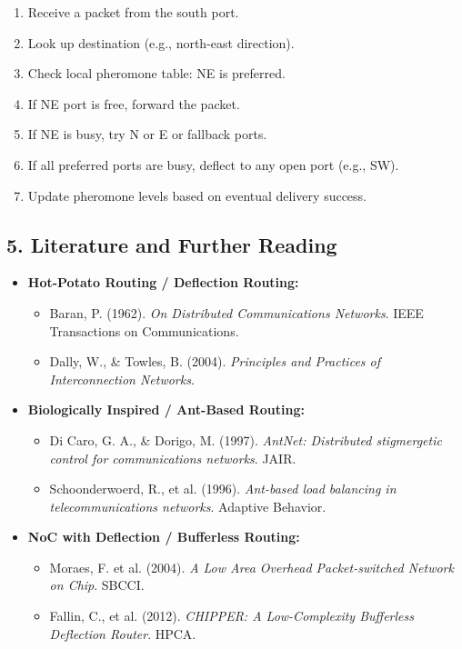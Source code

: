 \documentclass[../../../OAE-SPEC-MAIN.tex]{subfiles}
\begin{document}
\begin{enumerate}
    \item Receive a packet from the south port.
    \item Look up destination (e.g., north-east direction).
    \item Check local pheromone table: NE is preferred.
    \item If NE port is free, forward the packet.
    \item If NE is busy, try N or E or fallback ports.
    \item If all preferred ports are busy, deflect to any open port (e.g., SW).
    \item Update pheromone levels based on eventual delivery success.
\end{enumerate}

\subsection*{5. Literature and Further Reading}

\begin{itemize}
    \item \textbf{Hot-Potato Routing / Deflection Routing:}
    \begin{itemize}
        \item Baran, P. (1962). \textit{On Distributed Communications Networks}. IEEE Transactions on Communications.
        \item Dally, W., \& Towles, B. (2004). \textit{Principles and Practices of Interconnection Networks}.
    \end{itemize}
    
    \item \textbf{Biologically Inspired / Ant-Based Routing:}
    \begin{itemize}
        \item Di Caro, G. A., \& Dorigo, M. (1997). \textit{AntNet: Distributed stigmergetic control for communications networks}. JAIR.
        \item Schoonderwoerd, R., et al. (1996). \textit{Ant-based load balancing in telecommunications networks}. Adaptive Behavior.
    \end{itemize}

    \item \textbf{NoC with Deflection / Bufferless Routing:}
    \begin{itemize}
        \item Moraes, F. et al. (2004). \textit{A Low Area Overhead Packet-switched Network on Chip}. SBCCI.
        \item Fallin, C., et al. (2012). \textit{CHIPPER: A Low-Complexity Bufferless Deflection Router}. HPCA.
    \end{itemize}
\end{itemize}
\end{document}
